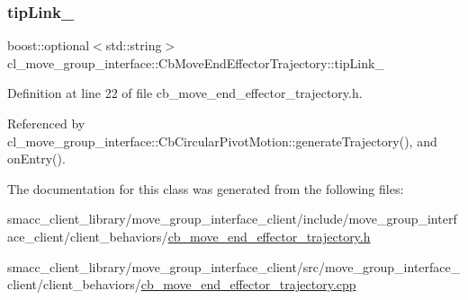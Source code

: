 \subsubsection{\texorpdfstring{tip\+Link\+\_\+}{tipLink\_}}
{\footnotesize\ttfamily boost\+::optional$<$std\+::string$>$ cl\+\_\+move\+\_\+group\+\_\+interface\+::\+Cb\+Move\+End\+Effector\+Trajectory\+::tip\+Link\+\_\+}



Definition at line 22 of file cb\+\_\+move\+\_\+end\+\_\+effector\+\_\+trajectory.\+h.



Referenced by cl\+\_\+move\+\_\+group\+\_\+interface\+::\+Cb\+Circular\+Pivot\+Motion\+::generate\+Trajectory(), and on\+Entry().



The documentation for this class was generated from the following files\+:\begin{DoxyCompactItemize}
\item 
smacc\+\_\+client\+\_\+library/move\+\_\+group\+\_\+interface\+\_\+client/include/move\+\_\+group\+\_\+interface\+\_\+client/client\+\_\+behaviors/\hyperlink{cb__move__end__effector__trajectory_8h}{cb\+\_\+move\+\_\+end\+\_\+effector\+\_\+trajectory.\+h}\item 
smacc\+\_\+client\+\_\+library/move\+\_\+group\+\_\+interface\+\_\+client/src/move\+\_\+group\+\_\+interface\+\_\+client/client\+\_\+behaviors/\hyperlink{cb__move__end__effector__trajectory_8cpp}{cb\+\_\+move\+\_\+end\+\_\+effector\+\_\+trajectory.\+cpp}\end{DoxyCompactItemize}
